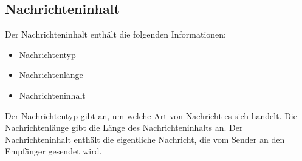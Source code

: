 \subsection{Nachrichteninhalt}

Der Nachrichteninhalt enthält die folgenden Informationen:

\begin{itemize}
    \item Nachrichtentyp
    \item Nachrichtenlänge
    \item Nachrichteninhalt
\end{itemize}

\noindent Der Nachrichtentyp gibt an, um welche Art von Nachricht es sich handelt. Die Nachrichtenlänge gibt die Länge des Nachrichteninhalts an. Der Nachrichteninhalt enthält die eigentliche Nachricht, die vom Sender an den Empfänger gesendet wird.